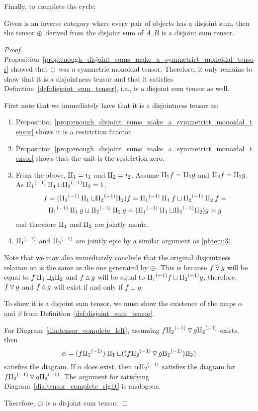Finally, to complete the cycle:
\begin{proposition}\label{prop:enough_disjoint_sums_make_a_disjoint_sum_tensor}
  Given \X is an inverse category where every pair of objects has a disjoint sum, then the tensor
  $\oplus$ derived from the disjoint sum of $A,B$ is a disjoint sum tensor.
\end{proposition}
\begin{proof}
  Proposition~\ref{prop:enough_disjoint_sums_make_a_symmetrict_monoidal_tensor} showed that
  $\oplus$ was a symmetric monoidal tensor. Therefore, it only remains to show that it is a disjointness
  tensor and that it satisfies Definition~\ref{def:disjoint_sum_tensor}, i.e., is a disjoint sum
  tensor as well.

  First note that we immediately have that it is a   disjointness tensor as:
    \begin{enumerate}[{(}i{)}]
      \item Proposition~\ref{prop:enough_disjoint_sums_make_a_symmetrict_monoidal_tensor} shows it
        is a restriction functor.
      \item Proposition~\ref{prop:enough_disjoint_sums_make_a_symmetrict_monoidal_tensor} shows that
        the unit is the restriction zero.
      \item From the above, $\amalg_{1} = i_1$ and $\amalg_{2} = i_2$. Assume $\amalg_{1} f = \amalg_{1} g$
        and $\amalg_{2} f = \amalg_{2} g$. As ${\amalg_{1}}^{(-1)} \amalg_{1} \sqcup {\amalg_{2}}^{(-1)} \amalg_{2} = 1$,
        \begin{multline*}
           f = ({\amalg_{1}}^{(-1)} \amalg_{1} \sqcup {\amalg_{2}}^{(-1)} \amalg_{2}) f = {\amalg_{1}}^{(-1)} \amalg_{1} f \sqcup {\amalg_{2}}^{(-1)} \amalg_{2} f = \\
           {\amalg_{1}}^{(-1)} \amalg_{1} g \sqcup {\amalg_{2}}^{(-1)} \amalg_{2} g =  ({\amalg_{1}}^{(-1)} \amalg_{1} \sqcup {\amalg_{2}}^{(-1)} \amalg_{2}) g = g
        \end{multline*}
        and therefore $\amalg_{1}$ and $\amalg_{2}$ are jointly monic.\label{pfitem:3}
      \item ${\amalg_{1}}^{(-1)}$ and ${\amalg_{2}}^{(-1)}$ are jointly epic by a similar argument as \ref{pfitem:3}.
    \end{enumerate}

  Note that we may also immediately conclude that the original disjointness relation on \X is the
  same as the one generated by $\oplus$. This is because $f \operatorname{\triangledown} g$ will be equal to $f\amalg_{1} \sqcup
  g\amalg_{2}$ and $f \operatorname{\vartriangle} g$ will be equal to ${\amalg_{1}}^{(-1)} f \sqcup {\amalg_{2}}^{(-1)} g$, therefore, $f\operatorname{\triangledown} g$ and $f
  \operatorname{\vartriangle} g$ will exist if and only if $f\perp g$.

  To show it is a disjoint sum tensor, we must show the existence of the maps $\alpha$ and $\beta$
  from Definition~\ref{def:disjoint_sum_tensor}.

  For Diagram~\ref{dia:tensor_complete_left}, assuming  $f{\amalg_{2}}^{(-1)} \operatorname{\triangledown} g{\amalg_{2}}^{(-1)}$ exists,
  then
  \[
    \alpha = (f{\amalg_{1}}^{(-1)})\amalg_{1} \sqcup ((f{\amalg_{2}}^{(-1)} \operatorname{\triangledown} g {\amalg_{2}}^{(-1)})\amalg_{2})
  \]
  satisfies the diagram. If $\alpha$ does exist, then $\alpha {\amalg_{2}}^{(-1)}$ satisfies the diagram for
  $f{\amalg_{2}}^{(-1)} \operatorname{\triangledown} g{\amalg_{2}}^{(-1)}$. The argument for satisfying Diagram~\ref{dia:tensor_complete_right} is
  analogous.

  Therefore, $\oplus$ is a disjoint sum tensor.
\end{proof}


